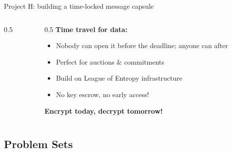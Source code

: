 \ifdefined\PRESENTATION\else\PassOptionsToClass{handout}{beamer}\fi\documentclass[aspectratio=169, lualatex]{beamer}
\begin{document}
\begin{frame}{Project H: building a time-locked message capsule}
	\begin{columns}[c]
		\begin{column}{0.5\textwidth}
		\end{column}
		\begin{column}{0.5\textwidth}
			\textbf{Time travel for data:}
			\begin{itemize}[<+->]
				\item Nobody can open it before the deadline; anyone can after
				\item Perfect for auctions \& commitments
				\item Build on League of Entropy infrastructure
				\item No key escrow, no early access!
			\end{itemize}
			\vspace{0.5cm}
			\textcolor{cipherprimary}{\textbf{Encrypt today, decrypt tomorrow!}}
		\end{column}
	\end{columns}
\end{frame}

\subsection{Problem Sets}
\end{document}
